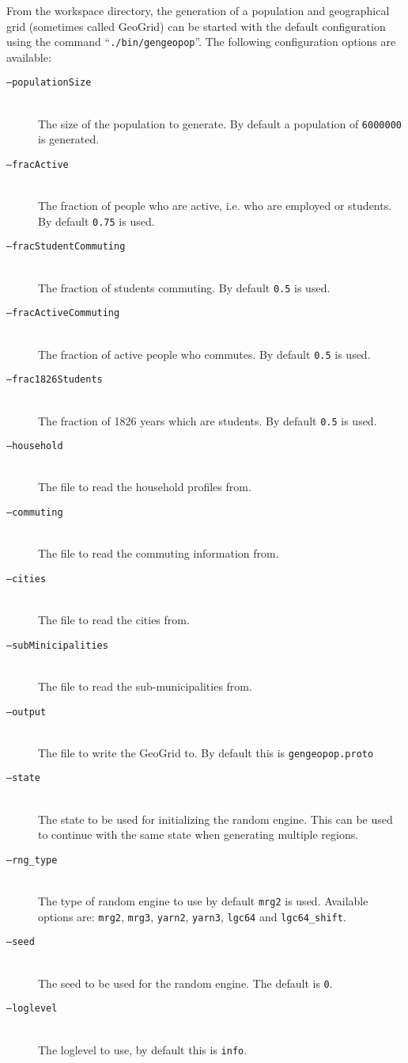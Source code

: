 From the workspace directory, the generation of a population and geographical grid (sometimes called GeoGrid) can be started with the default configuration using the command \mbox{``\texttt{./bin/gengeopop}''}. The following configuration options are available:

\begin{description}
    \item[\texttt{--populationSize}] \ \\
        The size of the population to generate. By default a population of \texttt{6000000} is generated.
    \item[\texttt{--fracActive}] \ \\
        The fraction of people who are active, i.e. who are employed or students. By default \texttt{0.75} is used.
    \item[\texttt{--fracStudentCommuting}] \ \\
        The fraction of students commuting. By default \texttt{0.5} is used.
    \item[\texttt{--fracActiveCommuting}] \ \\
        The fraction of active people who commutes. By default \texttt{0.5} is used.
    \item[\texttt{--frac1826Students}] \ \\
        The fraction of 1826 years which are students. By default \texttt{0.5} is used.
    \item[\texttt{--household}] \ \\
        The file to read the household profiles from.
    \item[\texttt{--commuting}] \ \\
        The file to read the commuting information from.
    \item[\texttt{--cities}] \ \\
        The file to read the cities from.
    \item[\texttt{--subMinicipalities}] \ \\
        The file to read the sub-municipalities from.
    \item[\texttt{--output}] \ \\
        The file to write the GeoGrid to. By default this is \texttt{gengeopop.proto}
    \item[\texttt{--state}] \ \\
        The state to be used for initializing the random engine. This can be used to continue with the same state when generating multiple regions.
    \item[\texttt{--rng\_type}] \ \\
        The type of random engine to use by default \texttt{mrg2} is used. Available options are: \texttt{mrg2}, \texttt{mrg3}, \texttt{yarn2}, \texttt{yarn3}, \texttt{lgc64} and \texttt{lgc64\_shift}.
    \item[\texttt{--seed}] \ \\
        The seed to be used for the random engine. The default is \texttt{0}.
    \item[\texttt{--loglevel}] \ \\
        The loglevel to use, by default this is \texttt{info}.
\end{description}

